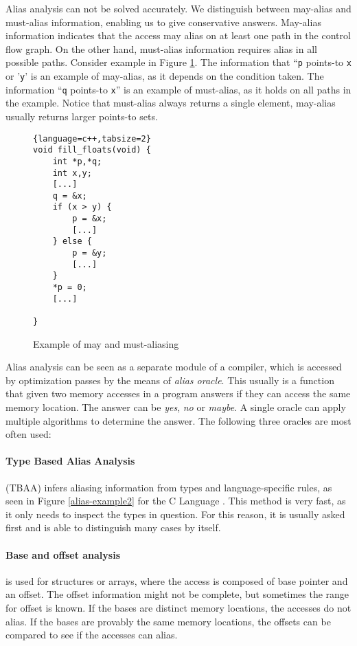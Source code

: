 Alias analysis can not be solved accurately.  We distinguish between may-alias
and must-alias information, enabling us to give conservative answers.  May-alias
information indicates that the access may alias on at least one path
in the control flow graph. On the other hand, must-alias information requires
alias in all possible paths. Consider example in Figure
\ref{alias-example-maymust}. The information that ``{\tt p} points-to {\tt x} or
'{\tt y}' is an example of may-alias, as it depends on the condition taken.
The information ``{\tt q} points-to {\tt x}'' is an example of must-alias, as it
holds on all paths in the example. Notice that must-alias always returns a
single element, may-alias usually returns larger points-to sets.

\begin{figure}[!ht]
\begin{tcolorbox}
\begin{lstlisting}{language=c++,tabsize=2}
void fill_floats(void) {
	int *p,*q;
	int x,y;
	[...]
	q = &x;
	if (x > y) {
		p = &x;
		[...]
	} else {
		p = &y;
		[...]
	}
	*p = 0;
	[...]
	
}
\end{lstlisting}
\end{tcolorbox}
\caption{Example of may and must-aliasing}
\label{alias-example-maymust}
\end{figure}

Alias analysis can be seen as a separate module of a compiler, which is accessed
by optimization passes by the means of {\it alias oracle}. This usually is a
function that given two memory accesses in a program answers if they can access
the same memory location. The answer can be {\it yes}, {\it no} or {\it maybe}.
A single oracle can apply multiple algorithms to determine the answer. The
following three oracles are most often used:

\label{sec-tbaa}
\paragraph{Type Based Alias Analysis} (TBAA) infers aliasing information from
types and language-specific rules, as seen in Figure \ref{alias-example2} for
the C Language \cite{isoc}. This method is
very fast, as it only needs to inspect the types in question. For this reason,
it is usually asked first and is able to distinguish many cases by itself.

\label{sec-baseoffset}
\paragraph{Base and offset analysis}
is used for structures or arrays, where the access is composed of base pointer and
an offset. The offset information might not be complete, but sometimes the range
for offset is known. If the bases are distinct memory locations, the accesses do
not alias.  If the bases are provably the same memory locations, the offsets can
be compared to see if the accesses can alias.

